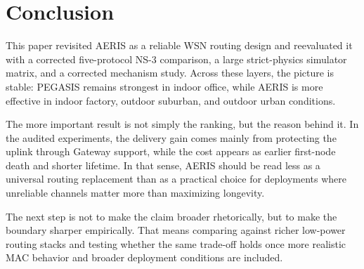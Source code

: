 \documentclass[letterpaper,conference]{IEEEtran}
\begin{document}
\section{Conclusion}
This paper revisited AERIS as a reliable WSN routing design and reevaluated it with a corrected five-protocol NS-3 comparison, a large strict-physics simulator matrix, and a corrected mechanism study. Across these layers, the picture is stable: PEGASIS remains strongest in indoor office, while AERIS is more effective in indoor factory, outdoor suburban, and outdoor urban conditions.

The more important result is not simply the ranking, but the reason behind it. In the audited experiments, the delivery gain comes mainly from protecting the uplink through Gateway support, while the cost appears as earlier first-node death and shorter lifetime. In that sense, AERIS should be read less as a universal routing replacement than as a practical choice for deployments where unreliable channels matter more than maximizing longevity.

The next step is not to make the claim broader rhetorically, but to make the boundary sharper empirically. That means comparing against richer low-power routing stacks and testing whether the same trade-off holds once more realistic MAC behavior and broader deployment conditions are included.

\FloatBarrier


\end{document}
